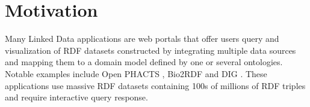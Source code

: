 \section{Motivation}
\label{sec:motivation}

Many Linked Data applications are web portals that offer users query and visualization of RDF datasets constructed by integrating multiple data sources and mapping them to a domain model defined by one or several ontologies.
Notable examples include Open PHACTS \cite{Groth_Loizou_Gray_Goble_Harland_Pettifer_2014}, Bio2RDF \cite{callahan2013bio2rdf} and DIG \cite{szekely2015building}.
These applications use massive RDF datasets containing 100s of millions of RDF triples and require interactive query response.